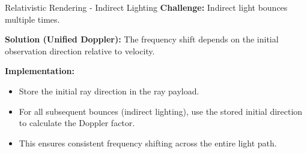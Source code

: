 \documentclass[aspectratio=169,xcolor=dvipsnames]{beamer}
\begin{document}
\begin{frame}{Relativistic Rendering - Indirect Lighting}
    \textbf{Challenge:} Indirect light bounces multiple times.
    
    \textbf{Solution (Unified Doppler):} The frequency shift depends on the initial observation direction relative to velocity.
    
    \textbf{Implementation:}
    \begin{itemize}
        \item Store the initial ray direction in the ray payload.
        \item For all subsequent bounces (indirect lighting), use the stored initial direction to calculate the Doppler factor.
        \item This ensures consistent frequency shifting across the entire light path.
    \end{itemize}
\end{frame}
\end{document}
